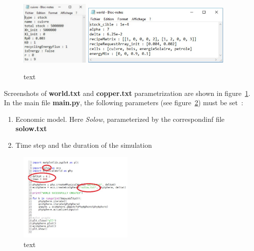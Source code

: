 \documentclass[12pt,a4paper]{article}%
\begin{document}
\begin{figure}[h]
	\centering
	\includegraphics[width=0.3\textwidth]{figures/param_copper.png}
	\includegraphics[width=0.65\textwidth]{figures/param_world.png}
	\caption{text}
	\label{fig:parametrization}
\end{figure}

\noindent Screenshots of \textbf{world.txt} and \textbf{copper.txt} parametrization are shown in figure~\ref{fig:parametrization}. In the main file \textbf{main.py}, the following parameters (see figure~\ref{fig:MainParametrization}) must be set~:

\begin{enumerate}
	\item Economic model. Here \textit{Solow}, parameterized by the correspondinf file \textbf{solow.txt} 
	 
	
	\item Time step and the duration of the simulation
\end{enumerate}

\begin{figure}[h]
	\centering
	\includegraphics[width=0.5\textwidth]{figures/Parametrisation2.jpg}
	\caption{text}
	\label{fig:MainParametrization}
\end{figure}
\end{document}
